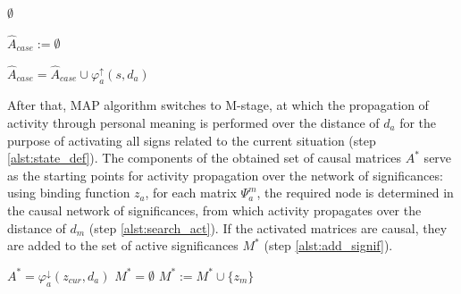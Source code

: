\documentclass[review]{elsarticle}
\begin{document}
\begin{algorithm}
	\begin{algorithmic}[1]
			\label{alst:exit}
			\State\Return $\emptyset$
			\EndIf
			
			\State $\hat A_{case}:=\emptyset$ 
			
			\Statex{}
			\Statex{}
			
			 \label{alst:check_wm}
			\label{alst:check_a}
			\State $\hat A_{case} = \hat A_{case} \cup \varphi_a^\uparrow(s,d_a)$ \label{alst:search_case}
			\EndIf
			\EndFor
			\EndFor
	\end{algorithmic}
\end{algorithm}

After that, MAP algorithm switches to M-stage, at which the propagation of activity through personal meaning is performed over the distance of $d_a$ for the purpose of activating all signs related to the current situation (step \ref{alst:state_def}). The components of the obtained set of causal matrices $A^*$ serve as the starting points for activity propagation over the network of significances: using binding function $z_a$, for each matrix $\Psi_a^m$, the required node is determined in the causal network of significances, from which activity propagates over the distance of $d_m$ (step \ref{alst:search_act}). If the activated matrices are causal, they are added to the set of active significances $M^*$ (step \ref{alst:add_signif}).

\begin{algorithm}
	\begin{algorithmic}[1]
		\Statex{}
		\Statex{}
		\State $A^* = \varphi_a^\downarrow(z_{cur}, d_a)$\label{alst:state_def}
		\State $M^*=\emptyset$
		\Statex{}
		 \label{alst:search_act}
		\State $M^* := M^*\cup\{z_m\}$ \label{alst:add_signif}
		\EndIf
		\EndFor
		\EndFor
	\end{algorithmic}
\end{algorithm}
\end{document}
